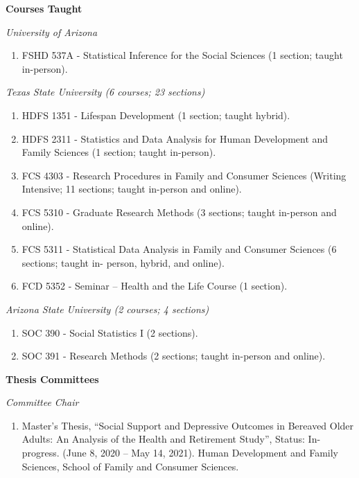 \documentclass[
]{article}
\providecommand{\tightlist}{%
  \setlength{\itemsep}{0pt}\setlength{\parskip}{0pt}}
\begin{document}
\textbf{Courses Taught}

\emph{University of Arizona}

\begin{enumerate}
\def\labelenumi{\arabic{enumi}.}
\tightlist
\item
  FSHD 537A - Statistical Inference for the Social Sciences (1 section;
  taught in-person).
\end{enumerate}

\emph{Texas State University (6 courses; 23 sections)}

\begin{enumerate}
\def\labelenumi{\arabic{enumi}.}
\item
  HDFS 1351 - Lifespan Development (1 section; taught hybrid).
\item
  HDFS 2311 - Statistics and Data Analysis for Human Development and
  Family Sciences (1 section; taught in-person).
\item
  FCS 4303 - Research Procedures in Family and Consumer Sciences
  (Writing Intensive; 11 sections; taught in-person and online).
\item
  FCS 5310 - Graduate Research Methods (3 sections; taught in-person and
  online).
\item
  FCS 5311 - Statistical Data Analysis in Family and Consumer Sciences
  (6 sections; taught in- person, hybrid, and online).
\item
  FCD 5352 - Seminar -- Health and the Life Course (1 section).
\end{enumerate}

\emph{Arizona State University (2 courses; 4 sections)}

\begin{enumerate}
\def\labelenumi{\arabic{enumi}.}
\item
  SOC 390 - Social Statistics I (2 sections).
\item
  SOC 391 - Research Methods (2 sections; taught in-person and online).
\end{enumerate}

\textbf{Thesis Committees}

\emph{Committee Chair}

\begin{enumerate}
\def\labelenumi{\arabic{enumi}.}
\tightlist
\item
  Master's Thesis, ``Social Support and Depressive Outcomes in Bereaved
  Older Adults: An Analysis of the Health and Retirement Study'',
  Status: In-progress. (June 8, 2020 -- May 14, 2021). Human Development
  and Family Sciences, School of Family and Consumer Sciences.
\end{enumerate}
\end{document}
